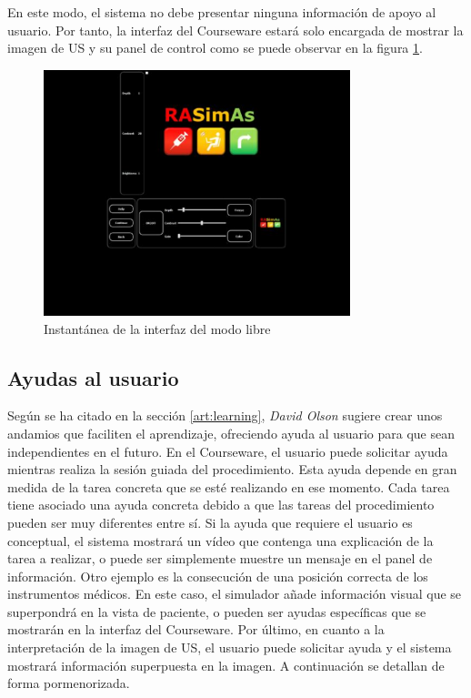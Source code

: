 En este modo, el sistema no debe presentar ninguna información de apoyo al usuario. Por tanto, la interfaz del \ac{Courseware} estará solo encargada de mostrar la imagen de \ac{US} y su panel de control como se puede observar en la figura \ref{fig:freeui}.

\begin{figure}[h]
    \centering
    \includegraphics[width=0.8\textwidth]{IMG/freeui.PNG}
    \caption{Instantánea de la interfaz del modo libre}
    \label{fig:freeui}
\end{figure}


 

\subsection{Ayudas al usuario}
\label{course:ayudas}

Según se ha citado en la sección \ref{art:learning}, \emph{David Olson} \cite{olson2014jerome} sugiere crear unos andamios que faciliten el aprendizaje, ofreciendo ayuda al usuario para que sean independientes en el futuro. En el \ac{Courseware}, el usuario puede solicitar ayuda mientras realiza la sesión guiada del procedimiento. Esta ayuda depende en gran medida de la tarea concreta que se esté realizando en ese momento. Cada tarea tiene asociado una ayuda concreta debido a que las tareas del procedimiento pueden ser muy diferentes entre sí. Si la ayuda que requiere el usuario es conceptual, el sistema mostrará un vídeo que contenga una explicación de la tarea a realizar, o puede ser simplemente  muestre un mensaje en el panel de información. Otro ejemplo es la consecución de una posición correcta de los instrumentos médicos. En este caso, el simulador añade información visual que se superpondrá en la vista de paciente, o pueden ser ayudas específicas que se mostrarán en la interfaz del \ac{Courseware}. Por último, en cuanto a la interpretación de la imagen de \ac{US}, el usuario puede solicitar ayuda y el sistema mostrará información superpuesta en la imagen. A continuación se detallan de forma pormenorizada.


